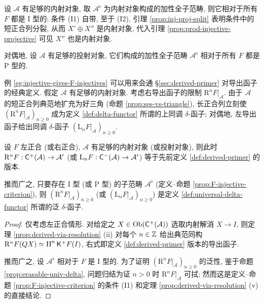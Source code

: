 \begin{example}[内射对象与投射对象]\label{eg:injective-gives-F-injectives}
	设 $\mathcal{A}$ 有足够的内射对象, 取 $\mathcal{A}^\flat$ 为内射对象构成的加性全子范畴, 则它相对于所有 $F$ 都是 I 型的: 条件 (I1) 自带, 至于 (I2), 引理 \ref{prop:inj-proj-split} 表明条件中的短正合列分裂, 从而 $X' \oplus X''$ 是内射对象, 代入引理 \ref{prop:prod-injective-projective} 可见 $X''$ 也是内射对象.
	
	对偶地, 设 $\mathcal{A}$ 有足够的投射对象, 它们构成的加性全子范畴 $\mathcal{A}^\flat$ 相对于所有 $F$ 都是 P 型的.
\end{example}

例 \ref{eg:injective-gives-F-injectives} 可以用来会通 \S\ref{sec:derived-primer} 对导出函子的经典定义. 假定 $\mathcal{A}$ 有足够的内射对象. 考虑右导出函子的限制 $\mathrm{R}^n F|_{\mathcal{A}}$. 由于 $\mathcal{A}$ 的短正合列典范地扩充为好三角 (命题 \ref{prop:ses-vs-triangle}), 长正合列立刻使 $\left(\mathrm{R}^n F|_{\mathcal{A}}\right)_{n \geq 0}$ 成为定义 \ref{def:delta-functor} 所谓的上同调 $\delta$-函子; 对偶地, 左导出函子给出同调 $\delta$-函子 $\left( \mathrm{L}_n F|_{\mathcal{A}} \right)_{n \geq 0}$.

\begin{proposition}
	设 $F$ 左正合 (或右正合), $\mathcal{A}$ 有足够的内射对象 (或投射对象), 则此时 $\mathrm{R}^n F: \mathsf{C}^+(\mathcal{A}) \to \mathcal{A}'$ (或 $\mathrm{L}_n F: \mathsf{C}^-(\mathcal{A}) \to \mathcal{A}'$) 等于先前定义 \ref{def:derived-primer} 的版本.

	推而广之, 只要存在 I 型 (或 P 型) 的子范畴 $\mathcal{A}^\flat$ (定义--命题 \ref{prop:F-injective-criterion}), 则 $\left( \mathrm{R}^n F|_{\mathcal{A}} \right)_{n \geq 0}$ (或 $\left(\mathrm{L}_n F|_{\mathcal{A}} \right)_{n \geq 0}$) 是定义 \ref{def:universal-delta-functor} 所谓的泛 $\delta$-函子.
\end{proposition}
\begin{proof}
	仅考虑左正合情形. 对给定之 $X \in \operatorname{Ob}(\mathsf{C}^+(\mathcal{A}))$ 选取内射解消 $X \to I$, 则定理 \ref{prop:derived-via-resolution} (ii) 对每个 $n \in \mathbb{Z}$ 给出典范同构 $\mathrm{R}^n F(QX) \simeq \operatorname{H}^n \mathsf{K}^+ F(I)$, 右式即定义 \ref{def:derived-primer} 版本的导出函子.
	
	推而广之, 设 $\mathcal{A}^\flat$ 相对于 $F$ 是 I 型的. 为了证明 $\left( \mathrm{R}^n F|_{\mathcal{A}} \right)_{n \geq 0}$ 的泛性, 鉴于命题 \ref{prop:erasable-univ-delta}, 问题归结为证 $n > 0$ 时 $\mathrm{R}^n F|_{\mathcal{A}}$ 可拭; 然而这是定义--命题 \ref{prop:F-injective-criterion} 的条件 (I1) 和定理 \ref{prop:derived-via-resolution} (v) 的直接结论.
\end{proof}

